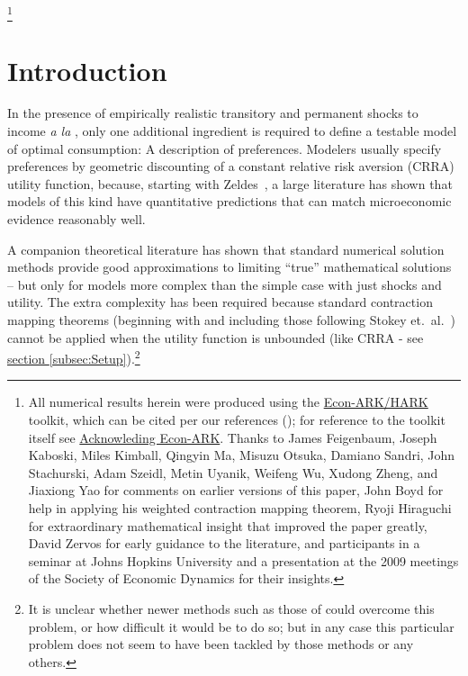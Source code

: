 \documentclass[./BufferStockTheory.tex]{subfiles}
\begin{document}
\thanks{All numerical results herein were produced using the \href{https://econ-ark/HARK}{Econ-ARK/HARK} toolkit, which can be cited per our references (\cite{carroll_et_al-proc-scipy-2018}); for reference to the toolkit itself see \href{https://econ-ark.org/acknowledging/}{Acknowleding Econ-ARK}.  Thanks to James Feigenbaum, Joseph Kaboski, Miles Kimball, Qingyin Ma, Misuzu Otsuka, Damiano Sandri, John Stachurski, Adam Szeidl, Metin Uyanik, Weifeng Wu, Xudong Zheng,
  and Jiaxiong Yao for comments on earlier versions of this paper, John Boyd for help
  in applying his weighted contraction mapping theorem, Ryoji
  Hiraguchi for extraordinary mathematical insight that improved the
  paper greatly, David Zervos for early guidance to the literature,
  and participants in a seminar at Johns Hopkins University and a
  presentation at the 2009 meetings of the Society of Economic
  Dynamics for their insights.}

\titlepagefinish

\newtheorem{defn}{Definition}
\newtheorem{theorem}{Theorem}

\hypertarget{Introduction}{}
\section{Introduction}

\label{sec:intro}





In the presence of empirically realistic transitory and permanent shocks to income \textit{a la} \cite{friedmanATheory}, only one additional ingredient is required to define a testable model of optimal consumption: A description of preferences.  Modelers usually specify preferences by geometric discounting of a constant relative risk aversion (CRRA) utility function, because, starting with Zeldes~\citeyearpar{zeldesStochastic}, a large literature has shown that models of this kind have quantitative predictions that can match microeconomic evidence reasonably well.

A companion theoretical literature has shown that standard numerical solution methods provide good approximations to limiting ``true'' mathematical solutions -- but only for models more complex than the simple case with just shocks and utility.  The extra complexity has been required because standard contraction mapping theorems (beginning with \cite{bellmanDynamicProgramming} and including those following Stokey et.~al.~\citeyearpar{slpMethods}) cannot be applied when the utility function is unbounded (like CRRA - see \hyperlink{DiffFromLit}{section \ref{subsec:Setup}}).\footnote{It is unclear whether newer methods such as those of \cite{mnUnique} could overcome this problem, or how difficult it would be to do so; but in any case this particular problem does not seem to have been tackled by those methods or any others.}
\end{document}
